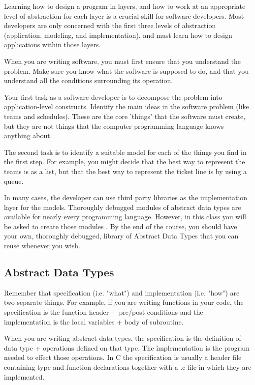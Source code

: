 Learning how to design a program in layers, and how to work at an appropriate level of abstraction for each layer is a crucial skill for software developers. Most developers are only concerned with the first three levels of abstraction (application, modeling, and implementation), and must learn how to design applications within those layers.

When you are writing software, you must first ensure that you understand the problem. Make sure you know what the software is supposed to do, and that you understand all the conditions surrounding its operation.

Your first task as a software developer is to decompose the problem into application-level constructs. Identify the main ideas in the software problem (like teams and schedules). These are the core 'things' that the software must create, but they are not things that the computer programming language knows anything about.

The second task is to identify a suitable model for each of the things you find in the first step. For example, you might decide that the best way to represent the teams is as a list, but that the best way to represent the ticket line is by using a queue.


In many cases, the developer can use third party libraries as the implementation layer for the models. Thoroughly debugged modules of abstract data types are available for nearly every programming language.
However, in this class you will be asked to create those modules . By the end of the course, you should have your own, thoroughly debugged, library of Abstract Data Types that you can reuse whenever you wish.

\subsection{Abstract Data Types}

Remember that specification (i.e. "what") and implementation (i.e. "how") are two separate things.
For example, if you are writing functions  in your code, the specification is the function header + pre/post conditions and the implementation is the local variables + body of subroutine.

When you are writing abstract data types, the specification is the definition of data type + operations defined on that type. The implementation is the program needed to effect those operations. In C the specification is usually a header file containing type and function declarations together with a .c file in which they are implemented.

